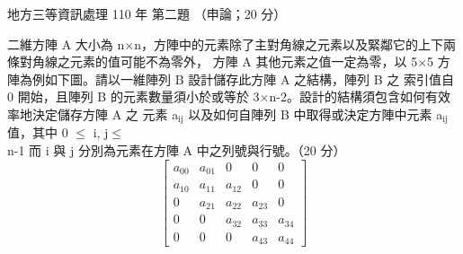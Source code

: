 \begin{pastexam}[label={px:df3-110-ds-02}]{地方三等資訊處理 110 年 第二題}
（申論；20 分）

二維方陣 A 大小為 n$\times$n，方陣中的元素除了主對角線之元素以及緊鄰它的上下兩條對角線之元素的值可能不為零外，
方陣 A 其他元素之值一定為零，以 5$\times$5 方陣為例如下圖。請以一維陣列 B 設計儲存此方陣 A 之結構，陣列 B 之
索引值自 0 開始，且陣列 B 的元素數量須小於或等於 3$\times$n-2。設計的結構須包含如何有效率地決定儲存方陣 A 之
元素 a$_\text{ij}$ 以及如何自陣列 B 中取得或決定方陣中元素 a$_\text{ij}$ 值，其中 0 $\le$ i, j$\le$n-1 而 i 與
j 分別為元素在方陣 A 中之列號與行號。（20 分）
\[
\begin{bmatrix}
a_{00} & a_{01} & 0 & 0 & 0 \\
a_{10} & a_{11} & a_{12} & 0 & 0 \\
0 & a_{21} & a_{22} & a_{23} & 0 \\
0 & 0 & a_{32} & a_{33} & a_{34} \\
0 & 0 & 0 & a_{43} & a_{44}
\end{bmatrix}
\]
\end{pastexam}

